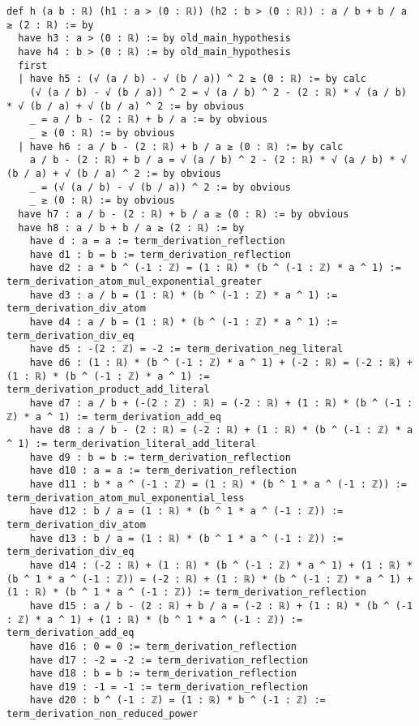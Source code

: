 \documentclass{article}
\begin{document}
\begin{tcolorbox}[colback=white!10, width=\linewidth]
\begin{lstlisting}[language=Lean4]
def h (a b : ℝ) (h1 : a > (0 : ℝ)) (h2 : b > (0 : ℝ)) : a / b + b / a ≥ (2 : ℝ) := by
  have h3 : a > (0 : ℝ) := by old_main_hypothesis
  have h4 : b > (0 : ℝ) := by old_main_hypothesis
  first
  | have h5 : (√ (a / b) - √ (b / a)) ^ 2 ≥ (0 : ℝ) := by calc
    (√ (a / b) - √ (b / a)) ^ 2 = √ (a / b) ^ 2 - (2 : ℝ) * √ (a / b) * √ (b / a) + √ (b / a) ^ 2 := by obvious
    _ = a / b - (2 : ℝ) + b / a := by obvious
    _ ≥ (0 : ℝ) := by obvious
  | have h6 : a / b - (2 : ℝ) + b / a ≥ (0 : ℝ) := by calc
    a / b - (2 : ℝ) + b / a = √ (a / b) ^ 2 - (2 : ℝ) * √ (a / b) * √ (b / a) + √ (b / a) ^ 2 := by obvious
    _ = (√ (a / b) - √ (b / a)) ^ 2 := by obvious
    _ ≥ (0 : ℝ) := by obvious
  have h7 : a / b - (2 : ℝ) + b / a ≥ (0 : ℝ) := by obvious
  have h8 : a / b + b / a ≥ (2 : ℝ) := by
    have d : a = a := term_derivation_reflection
    have d1 : b = b := term_derivation_reflection
    have d2 : a * b ^ (-1 : ℤ) = (1 : ℝ) * (b ^ (-1 : ℤ) * a ^ 1) := term_derivation_atom_mul_exponential_greater
    have d3 : a / b = (1 : ℝ) * (b ^ (-1 : ℤ) * a ^ 1) := term_derivation_div_atom
    have d4 : a / b = (1 : ℝ) * (b ^ (-1 : ℤ) * a ^ 1) := term_derivation_div_eq
    have d5 : -(2 : ℤ) = -2 := term_derivation_neg_literal
    have d6 : (1 : ℝ) * (b ^ (-1 : ℤ) * a ^ 1) + (-2 : ℝ) = (-2 : ℝ) + (1 : ℝ) * (b ^ (-1 : ℤ) * a ^ 1) := term_derivation_product_add_literal
    have d7 : a / b + (-(2 : ℤ) : ℝ) = (-2 : ℝ) + (1 : ℝ) * (b ^ (-1 : ℤ) * a ^ 1) := term_derivation_add_eq
    have d8 : a / b - (2 : ℝ) = (-2 : ℝ) + (1 : ℝ) * (b ^ (-1 : ℤ) * a ^ 1) := term_derivation_literal_add_literal
    have d9 : b = b := term_derivation_reflection
    have d10 : a = a := term_derivation_reflection
    have d11 : b * a ^ (-1 : ℤ) = (1 : ℝ) * (b ^ 1 * a ^ (-1 : ℤ)) := term_derivation_atom_mul_exponential_less
    have d12 : b / a = (1 : ℝ) * (b ^ 1 * a ^ (-1 : ℤ)) := term_derivation_div_atom
    have d13 : b / a = (1 : ℝ) * (b ^ 1 * a ^ (-1 : ℤ)) := term_derivation_div_eq
    have d14 : (-2 : ℝ) + (1 : ℝ) * (b ^ (-1 : ℤ) * a ^ 1) + (1 : ℝ) * (b ^ 1 * a ^ (-1 : ℤ)) = (-2 : ℝ) + (1 : ℝ) * (b ^ (-1 : ℤ) * a ^ 1) + (1 : ℝ) * (b ^ 1 * a ^ (-1 : ℤ)) := term_derivation_reflection
    have d15 : a / b - (2 : ℝ) + b / a = (-2 : ℝ) + (1 : ℝ) * (b ^ (-1 : ℤ) * a ^ 1) + (1 : ℝ) * (b ^ 1 * a ^ (-1 : ℤ)) := term_derivation_add_eq
    have d16 : 0 = 0 := term_derivation_reflection
    have d17 : -2 = -2 := term_derivation_reflection
    have d18 : b = b := term_derivation_reflection
    have d19 : -1 = -1 := term_derivation_reflection
    have d20 : b ^ (-1 : ℤ) = (1 : ℝ) * b ^ (-1 : ℤ) := term_derivation_non_reduced_power

\end{lstlisting}
\end{tcolorbox}
\end{document}
